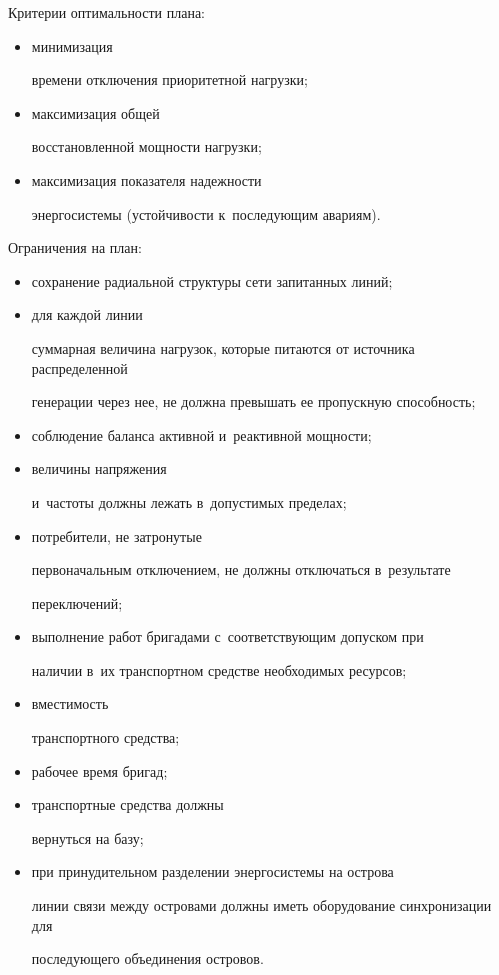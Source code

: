  Критерии оптимальности плана: 


 \begin{itemize}


 \item минимизация 


времени отключения приоритетной нагрузки;


\item максимизация общей 


восстановленной мощности нагрузки;


\item максимизация показателя надежности 


энергосистемы (устойчивости к~последующим авариям).


\end{itemize}





Ограничения на план: 


\begin{itemize}


\item сохранение радиальной структуры сети запитанных линий; 


\item для каждой линии 


суммарная величина нагрузок, которые питаются от источника распределенной 


генерации через нее, не должна превышать ее пропускную способность; 


\item соблюдение баланса активной и~реактивной мощности; 


\item величины напряжения 


и~частоты должны лежать в~допустимых пределах; 


\item потребители, не затронутые 


первоначальным отключением, не должны отключаться в~результате 


переключений; 


\item выполнение работ бригадами с~соответствующим допуском при 


наличии в~их транспортном средстве необходимых ресурсов; 


\item вместимость 


транспортного средства; 


\item рабочее время бригад; 


\item транспортные средства должны 


вернуться на базу; 


\item при принудительном разделении энергосистемы на острова 


линии связи между островами должны иметь оборудование синхронизации для 


последующего объединения островов.


\end{itemize}



